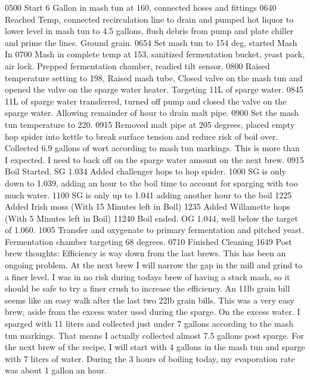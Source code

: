 0500 Start 6 Gallon in mash tun at 160, connected hoses and fittings
0640 Reached Temp, connected recirculation line to drain and pumped hot liquor to lower level in mash tun to 4.5 gallons, flush debris from pump and plate chiller and prime the lines.  Ground grain.
0654 Set mash tun to 154 deg, started Mash In
0700 Mash in complete temp at 153, sanitized fermentation bucket, yeast pack, air lock.  Prepped fermentation chamber, readied tilt sensor.
0800 Raised temperature setting to 198, Raised mash tube, Closed valve on the mash tun and opened the valve on the sparge water heater.  Targeting 11L of sparge water.
0845 11L of sparge water transferred, turned off pump and closed the valve on the sparge water.  Allowing remainder of hour to drain malt pipe.
0900 Set the mash tun temperature to 220.
0915 Removed malt pipe at 205 degrees, placed empty hop spider into kettle to break surface tension and reduce risk of boil over.  Collected 6.9 gallons of wort according to mash tun markings.  This is more than I expected.  I need to back off on the sparge water amount on the next brew.
0915 Boil Started. SG 1.034 Added challenger hops to hop spider.
1000 SG is only down to 1.039, adding an hour to the boil time to account for sparging with too much water.
1100 SG is only up to 1.041 adding another hour to the boil
1225 Added Irish moss (With 15 Minutes left in Boil)
1235 Added Willamette hops (With 5 Minutes left in Boil)
11240 Boil ended. OG 1.044, well below the target of 1.060.
1005 Transfer and oxygenate to primary fermentation and pitched yeast.  Fermentation chamber targeting 68 degrees.
0710 Finished Cleaning
1649 Post brew thoughts:  Efficiency is way down from the last brews.  This has been an ongoing problem.  At the next brew I will narrow the gap in the mill and grind to a finer level.  I was in no risk during todays brew of having a stuck mash, so it should be safe to try a finer crush to increase the efficiency.  An 11lb grain bill seems like an easy walk after the last two 22lb grain bills.  This was a very easy brew, aside from the excess water used during the sparge.  On the excess water.  I sparged with 11 liters and collected just under 7 gallons according to the mash tun markings.  That means I actually collected almost 7.5 gallons post sparge.  For the next brew of the recipe, I will start with 4 gallons in the mash tun and sparge with 7 liters of water.  During the 3 hours of boiling today, my evaporation rate was about 1 gallon an hour.

\def\todaysdate{20200212}
\newday{\todaysdate}\label{\todaysdate}

